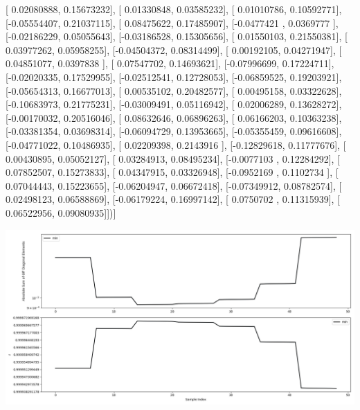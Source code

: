 \documentclass{article}
\begin{document}
       [ 0.02080888,  0.15673232],
       [ 0.01330848,  0.03585232],
       [ 0.01010786,  0.10592771],
       [-0.05554407,  0.21037115],
       [ 0.08475622,  0.17485907],
       [-0.0477421 ,  0.0369777 ],
       [-0.02186229,  0.05055643],
       [-0.03186528,  0.15305656],
       [ 0.01550103,  0.21550381],
       [ 0.03977262,  0.05958255],
       [-0.04504372,  0.08314499],
       [ 0.00192105,  0.04271947],
       [ 0.04851077,  0.0397838 ],
       [ 0.07547702,  0.14693621],
       [-0.07996699,  0.17224711],
       [-0.02020335,  0.17529955],
       [-0.02512541,  0.12728053],
       [-0.06859525,  0.19203921],
       [-0.05654313,  0.16677013],
       [ 0.00535102,  0.20482577],
       [ 0.00495158,  0.03322628],
       [-0.10683973,  0.21775231],
       [-0.03009491,  0.05116942],
       [ 0.02006289,  0.13628272],
       [-0.00170032,  0.20516046],
       [ 0.08632646,  0.06896263],
       [ 0.06166203,  0.10363238],
       [-0.03381354,  0.03698314],
       [-0.06094729,  0.13953665],
       [-0.05355459,  0.09616608],
       [-0.04771022,  0.10486935],
       [ 0.02209398,  0.2143916 ],
       [-0.12829618,  0.11777676],
       [ 0.00430895,  0.05052127],
       [ 0.03284913,  0.08495234],
       [-0.0077103 ,  0.12284292],
       [ 0.07852507,  0.15273833],
       [ 0.04347915,  0.03326948],
       [-0.0952169 ,  0.1102734 ],
       [ 0.07044443,  0.15223655],
       [-0.06204947,  0.06672418],
       [-0.07349912,  0.08782574],
       [ 0.02498123,  0.06588869],
       [-0.06179224,  0.16997142],
       [ 0.0750702 ,  0.11315939],
       [ 0.06522956,  0.09080935]])]
\begin{center}
\includegraphics[scale=.9]{report_pickled_controls129/control_dpn_all.png}

\end{center}
\end{document}
